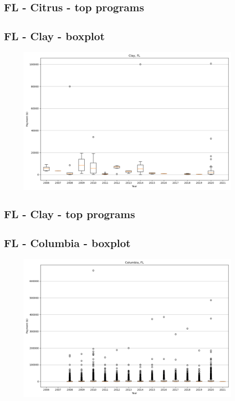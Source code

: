 \subsection*{FL - Citrus - top programs}

\newpage
\subsection*{FL - Clay - boxplot}
\begin{figure}[h]
\centering
\includegraphics[width=7in]{../output/boxplots/counties/Clay-FL_boxplot.png}
\end{figure}


\subsection*{FL - Clay - top programs}

\newpage
\subsection*{FL - Columbia - boxplot}
\begin{figure}[h]
\centering
\includegraphics[width=7in]{../output/boxplots/counties/Columbia-FL_boxplot.png}
\end{figure}


